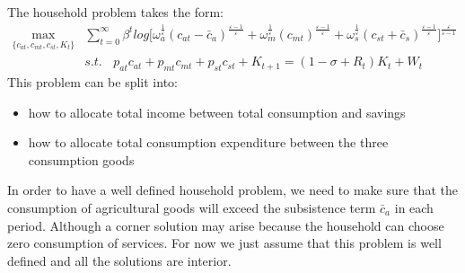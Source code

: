 \documentclass{article}
\begin{document}
    The household problem takes the form:
    \begin{align*}
        \max_{\{ c_{at},c_{mt},c_{st},K_t \}}& \sum_{t=0}^{\infty} \beta^t log \biggl[ \omega_a^{\frac{1}{\varepsilon}} (c_{at}-\bar{c}_a)^\frac{\varepsilon-1}{\varepsilon} + \omega_m^{\frac{1}{\varepsilon}} (c_{mt})^\frac{\varepsilon-1}{\varepsilon} + \omega_s^{\frac{1}{\varepsilon}} (c_{st}+\bar{c}_s)^\frac{\varepsilon-1}{\varepsilon} \biggr]^{\frac{\varepsilon}{\varepsilon-1}}\\
        &s.t.\ \ \ \ p_{at}c_{at}+p_{mt}c_{mt}+p_{st}c_{st}+K_{t+1}=(1-\sigma+R_t)K_t+W_t
    \end{align*}
    This problem can be split into:
    \begin{itemize}
        \item how to allocate total income between total consumption and savings
        \item how to allocate total consumption expenditure between the three consumption goods
    \end{itemize}

    In order to have a well defined household problem, we need to make sure that the consumption of agricultural goods will exceed the subsistence term $\bar{c}_{a}$ in each period. Although a corner solution may arise because the household can choose zero consumption of services. For now we just assume that this problem is well defined and all the solutions are interior.
\end{document}
